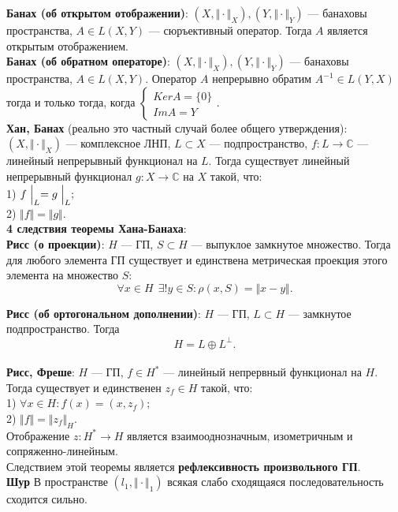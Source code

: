 \documentclass[12pt,a4paper]{scrartcl}
\begin{document}
\textbf{Банах (об открытом отображении)}: $(X, \Vert \cdot \Vert_X), (Y, \Vert \cdot \Vert_Y)$ — банаховы пространства, $A \in L(X, Y)$ — сюръективный оператор. Тогда $A$ является открытым отображением. \\

\textbf{Банах (об обратном операторе)}: $(X, \Vert \cdot \Vert_X), (Y, \Vert \cdot \Vert_Y)$ — банаховы пространства, $A \in L(X, Y).$ Оператор $A$ непрерывно обратим $A^{-1} \in L(Y, X)$ тогда и только тогда, когда $\begin{cases} Ker A = \{0\} \\ Im A = Y\end{cases}.$\\

\textbf{Хан, Банах} (реально это частный случай более общего утверждения): $(X, \Vert \cdot \Vert_X)$ — комплексное ЛНП, $L \subset X$ — подпространство, $f: L \rightarrow \mathbb{C}$ — линейный непрерывный функционал на $L.$ Тогда существует линейный непрерывный функционал $g: X \rightarrow \mathbb{C}$ на $X$ такой, что: \\
1) $f\Bigm|_{L} = g\Bigm|_{L};$\\
2) $\Vert f\Vert = \Vert g\Vert.$\\
\textbf{4 следствия теоремы Хана-Банаха}: \\

\textbf{Рисс (о проекции)}: $H$ — ГП, $S \subset H$ — выпуклое замкнутое множество. Тогда для любого элемента ГП существует и единствена метрическая проекция этого элемента на множество $S:$
$$\forall x \in H \ \ \exists ! y \in S: \rho(x, S) = \Vert x - y\Vert.$$

\textbf{Рисс (об ортогональном дополнении)}: $H$ — ГП, $L \subset H$ — замкнутое подпространство. Тогда 
$$H = L \oplus L^{\bot}.$$\\ 

\textbf{Рисс, Фреше}: $H$ — ГП, $f \in H^*$ — линейный непрервный функционал на $H.$ Тогда существует и единственен $z_f \in H$ такой, что: \\
1) $\forall x \in H: f(x) = (x, z_f);$\\
2) $\Vert f\Vert = \Vert z_f\Vert_H.$\\
Отображение $z: H^* \rightarrow H$ является взаимооднозначным, изометричным и сопряженно-линейным.\\
Следствием этой теоремы является \textbf{рефлексивность произвольного ГП}.\\

\textbf{Шур} В пространстве $(l_1, \Vert \cdot \Vert_1)$ всякая слабо сходящаяся последовательность сходится сильно.\\
\end{document}
